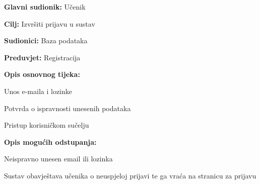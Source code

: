 					\noindent {}
					\begin{packed_item}
	
						\item \textbf{Glavni sudionik: }Učenik
						\item  \textbf{Cilj:} Izvršiti prijavu u sustav
						\item  \textbf{Sudionici:} Baza podataka
						\item  \textbf{Preduvjet:} Registracija
						\item  \textbf{Opis osnovnog tijeka:}
						
						\item[] \begin{packed_enum}
	
							\item Unos e-maila i lozinke
							\item Potvrda o ispravnosti unesenih podataka
							\item Pristup korisničkom sučelju
						\end{packed_enum}
						
						\item  \textbf{Opis mogućih odstupanja:}
						
						\item[] \begin{packed_item}
	
							\item[2.a] Neispravno unesen email ili lozinka
							\item[] \begin{packed_enum}
								
								\item Sustav obavještava učenika o neuspjeloj prijavi te ga vraća na stranicu za prijavu
								
							\end{packed_enum}
							
						\end{packed_item}
					\end{packed_item}

